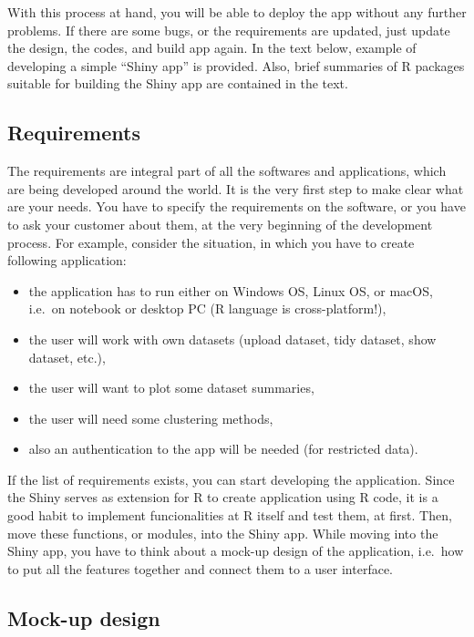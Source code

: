 \documentclass[
]{article}
\providecommand{\tightlist}{%
  \setlength{\itemsep}{0pt}\setlength{\parskip}{0pt}}
\begin{document}
With this process at hand, you will be able to deploy the app without
any further problems. If there are some bugs, or the requirements are
updated, just update the design, the codes, and build app again. In the
text below, example of developing a simple ``Shiny app'' is provided.
Also, brief summaries of R packages suitable for building the Shiny app
are contained in the text.

\hypertarget{requirements}{%
\subsection{Requirements}\label{requirements}}

The requirements are integral part of all the softwares and
applications, which are being developed around the world. It is the very
first step to make clear what are your needs. You have to specify the
requirements on the software, or you have to ask your customer about
them, at the very beginning of the development process. For example,
consider the situation, in which you have to create following
application:

\begin{itemize}
\tightlist
\item
  the application has to run either on Windows OS, Linux OS, or macOS,
  i.e.~on notebook or desktop PC (R language is cross-platform!),
\item
  the user will work with own datasets (upload dataset, tidy dataset,
  show dataset, etc.),
\item
  the user will want to plot some dataset summaries,
\item
  the user will need some clustering methods,
\item
  also an authentication to the app will be needed (for restricted
  data).
\end{itemize}

If the list of requirements exists, you can start developing the
application. Since the Shiny serves as extension for R to create
application using R code, it is a good habit to implement funcionalities
at R itself and test them, at first. Then, move these functions, or
modules, into the Shiny app. While moving into the Shiny app, you have
to think about a mock-up design of the application, i.e.~how to put all
the features together and connect them to a user interface.

\hypertarget{mock-up-design}{%
\subsection{Mock-up design}\label{mock-up-design}}
\end{document}
